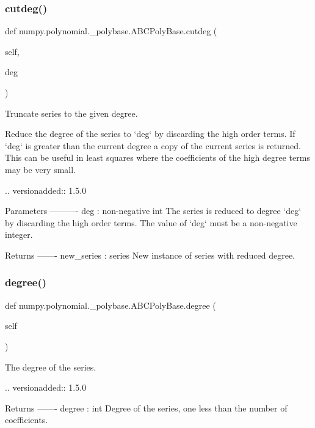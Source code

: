 \subsubsection{\texorpdfstring{cutdeg()}{cutdeg()}}
{\footnotesize\ttfamily def numpy.\+polynomial.\+\_\+polybase.\+A\+B\+C\+Poly\+Base.\+cutdeg (\begin{DoxyParamCaption}\item[{}]{self,  }\item[{}]{deg }\end{DoxyParamCaption})}

\begin{DoxyVerb}Truncate series to the given degree.

Reduce the degree of the series to `deg` by discarding the
high order terms. If `deg` is greater than the current degree a
copy of the current series is returned. This can be useful in least
squares where the coefficients of the high degree terms may be very
small.

.. versionadded:: 1.5.0

Parameters
----------
deg : non-negative int
    The series is reduced to degree `deg` by discarding the high
    order terms. The value of `deg` must be a non-negative integer.

Returns
-------
new_series : series
    New instance of series with reduced degree.\end{DoxyVerb}
 \mbox{\label{classnumpy_1_1polynomial_1_1__polybase_1_1ABCPolyBase_aff8f97163aa530f5efdc07c3686ad006}} 
\subsubsection{\texorpdfstring{degree()}{degree()}}
{\footnotesize\ttfamily def numpy.\+polynomial.\+\_\+polybase.\+A\+B\+C\+Poly\+Base.\+degree (\begin{DoxyParamCaption}\item[{}]{self }\end{DoxyParamCaption})}

\begin{DoxyVerb}The degree of the series.

.. versionadded:: 1.5.0

Returns
-------
degree : int
    Degree of the series, one less than the number of coefficients.\end{DoxyVerb}
 \mbox{\label{classnumpy_1_1polynomial_1_1__polybase_1_1ABCPolyBase_a85f245aded26dd056360baaed723ef49}} 
